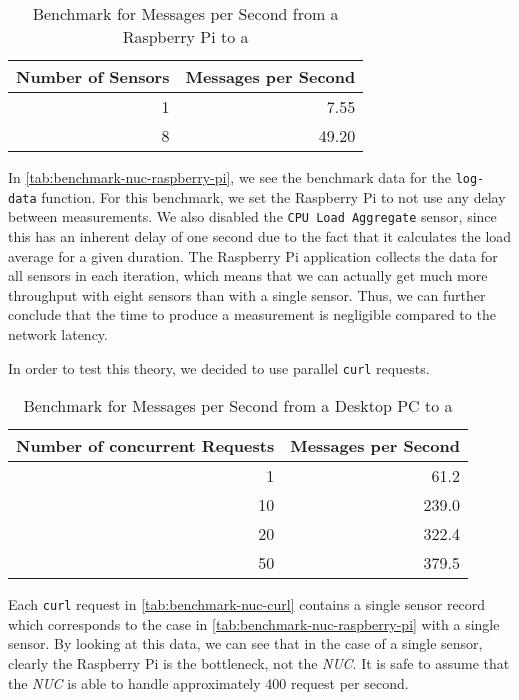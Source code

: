 \begin{table}[H]
  \centering
  \begin{tabular}{|r|r|}
    \hline
    Number of Sensors & Messages per Second \\ \hline
                    1 &                7.55 \\ \hline
                    8 &               49.20 \\ \hline
  \end{tabular}
  \caption{Benchmark for Messages per Second from a Raspberry Pi to a }
  \label{tab:benchmark-nuc-raspberry-pi}
\end{table}

In \autoref{tab:benchmark-nuc-raspberry-pi}, we see the benchmark data for the \texttt{log-data}
function. For this benchmark, we set the Raspberry Pi to not use any delay between measurements. We
also disabled the \texttt{CPU Load Aggregate} sensor, since this has an inherent delay of one second
due to the fact that it calculates the load average for a given duration. The Raspberry Pi
application collects the data for all sensors in each iteration, which means that we can actually
get much more throughput with eight sensors than with a single sensor. Thus, we can further conclude
that the time to produce a measurement is negligible compared to the network latency.

In order to test this theory, we decided to use parallel \texttt{curl} requests.

\begin{table}[H]
  \centering
  \begin{tabular}{|r|r|}
    \hline
    Number of concurrent Requests & Messages per Second \\ \hline
                                1 &                61.2 \\ \hline
                               10 &               239.0 \\ \hline
                               20 &               322.4 \\ \hline
                               50 &               379.5 \\ \hline
  \end{tabular}
  \caption{Benchmark for Messages per Second from a Desktop PC to a }
  \label{tab:benchmark-nuc-curl}
\end{table}

Each \texttt{curl} request in \autoref{tab:benchmark-nuc-curl} contains a single sensor record which
corresponds to the case in \autoref{tab:benchmark-nuc-raspberry-pi} with a single sensor. By looking
at this data, we can see that in the case of a single sensor, clearly the Raspberry Pi is the
bottleneck, not the \textit{NUC}. It is safe to assume that the \textit{NUC} is able to handle
approximately 400 request per second.

